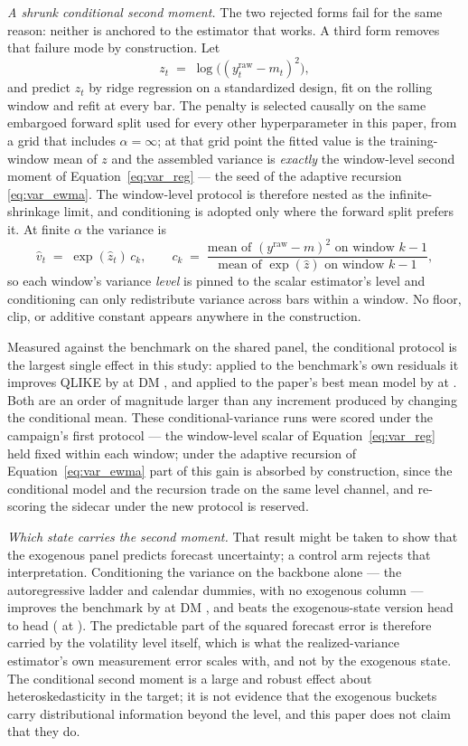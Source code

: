 \emph{A shrunk conditional second moment.} The two rejected forms fail
for the same reason: neither is anchored to the estimator that works.
A third form removes that failure mode by construction. Let
\[
z_t \;=\; \log\bigl( (y^{\mathrm{raw}}_t - m_t)^2 \bigr),
\]
and predict $z_t$ by ridge regression on a standardized design, fit on
the rolling window and refit at every bar. The penalty is selected
causally on the same embargoed forward split used for every other
hyperparameter in this paper, from a grid that includes
$\alpha = \infty$; at that grid point the fitted value is the
training-window mean of $z$ and the assembled variance is
\emph{exactly} the window-level second moment of
Equation~\eqref{eq:var_reg} --- the seed of the adaptive recursion
\eqref{eq:var_ewma}. The window-level protocol is therefore nested as
the infinite-shrinkage limit, and conditioning is adopted only where the
forward split prefers it. At finite $\alpha$ the variance is
\[
\hat{v}_t \;=\; \exp(\hat{z}_t)\, c_k,
\qquad
c_k \;=\;
\frac{\text{mean of } (y^{\mathrm{raw}} - m)^2 \text{ on window } k-1}
     {\text{mean of } \exp(\hat{z}) \text{ on window } k-1},
\]
so each window's variance \emph{level} is pinned to the scalar
estimator's level and conditioning can only redistribute variance across
bars within a window. No floor, clip, or additive constant appears
anywhere in the construction.

Measured against the benchmark on the shared panel, the conditional
protocol is the largest single effect in this study: applied to the
benchmark's own residuals it improves QLIKE by
\unifIncrCondVarBenchDQ{} at DM \unifIncrCondVarBenchDM{}, and applied
to the paper's best mean model by \unifIncrCondVarChampDQ{} at
\unifIncrCondVarChampDM{}. Both are an order of magnitude larger than
any increment produced by changing the conditional mean. These
conditional-variance runs were scored under the campaign's first protocol --- the window-level scalar of Equation~\eqref{eq:var_reg}
held fixed within each window; under the adaptive recursion of
Equation~\eqref{eq:var_ewma} part of this gain is absorbed by
construction, since the conditional model and the recursion trade on
the same level channel, and re-scoring the sidecar under the new
protocol is reserved.

\emph{Which state carries the second moment.} That result might be taken to
show that the exogenous panel predicts forecast uncertainty; a
control arm rejects that interpretation. Conditioning the variance on the backbone alone
--- the autoregressive ladder and calendar dummies, with no exogenous
column --- improves the benchmark by \unifIncrCondVarBenchLevelDQ{} at
DM \unifIncrCondVarBenchLevelDM{}, and beats the exogenous-state
version head to head
(\unifIncrCondVarBenchLevelVsCondVarBenchDQ{} at
\unifIncrCondVarBenchLevelVsCondVarBenchDM{}). The predictable part of
the squared forecast error is therefore carried by the volatility level
itself, which is what the realized-variance estimator's own measurement
error scales with, and not by the exogenous state. The conditional
second moment is a large and robust effect about heteroskedasticity in
the target; it is not evidence that the exogenous buckets carry
distributional information beyond the level, and this paper does not
claim that they do.

